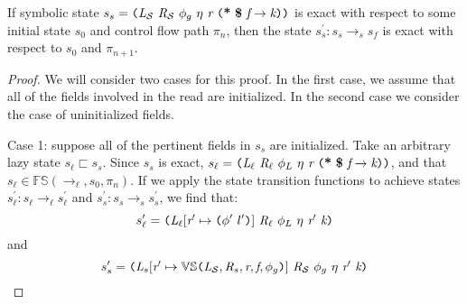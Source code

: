\begin{lemma}
If symbolic state $s_s = \lp \cfgnt{L}_{\mathcal{S}}\ \cfgnt{R}_{\mathcal{S}}\ \phi_g\ \eta\ \cfgnt{r}\ \lp \cfgt{*}\ \cfgt{\$}\ \cfgnt{f} \rightarrow \cfgnt{k}\rp \rp$ is exact with respect to some initial state $s_0$ and control flow path $\pi_n$, then the state $s_s^\prime : s_s \rightarrow_s s_f$ is exact with respect to $s_0$ and $\pi_{n+1}$.
\end{lemma}

\begin{proof}
We will consider two cases for this proof. In the first case, we assume that all of the fields involved in the read are initialized. In the second case we consider the case of uninitialized fields. 

Case 1: suppose all of the pertinent fields in $s_s$ are initialized. Take an arbitrary lazy state $s_\ell \sqsubset s_s$. Since $s_s$ is exact,  $s_\ell = \lp \cfgnt{L}_{\ell}\ \cfgnt{R}_{\ell}\ \phi_L\ \eta\ \cfgnt{r}\ \lp \cfgt{*}\ \cfgt{\$}\ \cfgnt{f} \rightarrow \cfgnt{k} \rp \rp$, and that $s_\ell \in \mathbb{FS}(\rightarrow_{\ell},s_0,\pi_n)$. If we apply the state transition functions to achieve states $s_\ell^\prime : s_\ell \rightarrow_\ell s_\ell^\prime$ and $s_s^\prime : s_s \rightarrow_s s_s^\prime$, we find that:
$$s_\ell^\prime = \lp \cfgnt{L}_{\ell} [\cfgnt{r}^\prime \mapsto \lp\phi^\prime\ l^\prime\rp]\ \cfgnt{R}_{\ell}\ \phi_L\ \eta\ \cfgnt{r}^\prime\ \cfgnt{k}\rp $$
 and 
 $$ s_s^\prime = \lp \cfgnt{L}_{s}[\cfgnt{r}^\prime \mapsto \mathbb{VS}\lp \cfgnt{L}_{\mathcal{S}},\cfgnt{R}_{s},\cfgnt{r},\cfgnt{f},\phi_g\rp ]\ \cfgnt{R}_{\mathcal{S}}\ \phi_g\ \eta\ \cfgnt{r}^\prime\ \cfgnt{k}\rp $$


\end{proof}

